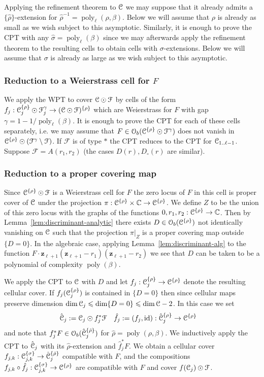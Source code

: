 \documentclass[reqno]{amsart}
\renewcommand\~[1]{\widetilde{#1}}
\def\poly{\operatorname{poly}} \def\J{\operatorname{J}}
\def\cF{{\mathcal F}} \def\cL{{\mathcal L}} \def\cR{{\mathcal R}}
\def\cO{{\mathcal O}}
\def\rest#1{{\vert_{#1}}} \def\onL{\rest{\cL}}
\def\id{\operatorname{id}}
\def\vz{{\mathbf z}}
\def\he#1{{\{#1\}}}
\def\hrho{{\he\rho}}
\def\hsigma{{\he\sigma}}
\begin{document}
Applying the refinement theorem to ${\mathcal C}$ we may suppose that it
already admits a $\he{\hat\rho}$-extension for
$\hat\rho^{-1}=\poly_\ell(\rho,\beta)$. Below we will assume that
$\rho$ is already as small as we wish subject to this
asymptotic. Similarly, it is enough to prove the CPT with any
$\hat\sigma=\poly_\ell(\beta)$ since we may afterwards apply the refinement
theorem to the resulting cells to obtain cells with
$\sigma$-extensions. Below we will assume that $\sigma$ is already as
large as we wish subject to this asymptotic.

\subsubsection{Reduction to a Weierstrass cell for $F$}

We apply the WPT to cover $\cC\odot\cF$ by cells of the form
$f_j:\cC_j^\hrho\odot\cF_j^\gamma\to(\cC\odot\cF)^\hrho$ which are Weierstrass
for $F$ with gap $\gamma=1-1/\poly_\ell(\beta)$. It is enough to prove
the CPT for each of these cells separately, i.e. we may assume that
$F\in\cO_b(\cC^\hrho\odot\cF^\gamma)$ does not vanish in
$\cC^\hrho\odot(\cF^\gamma\setminus\cF)$. If $\cF$ is of type $*$ the
CPT reduces to the CPT for ${\mathcal C}_{1..\ell-1}$. Suppose $\cF=A(r_1,r_2)$
(the cases $D(r),D_\circ(r)$ are similar).

\subsubsection{Reduction to a proper covering map}

Since $\cC^\hrho\odot\cF$ is a Weierstrass cell for $F$ the zero locus
of $F$ in this cell is proper cover of ${\mathcal C}$ under the projection
$\pi:\cC^\hrho\times\C\to\cC^\hrho$. We define $Z$ to be the union of
this zero locus with the graphs of the functions
$0,r_1,r_2:\cC^\hrho\to\C$. Then by
Lemma~\ref{lem:discriminant-analytic} there exists
$D\in\cO_b(\cC^\hrho)$ not identically vanishing on ${\mathcal C}$ such that
the projection $\pi\rest Z$ is a proper covering map outside
$\{D=0\}$. In the algebraic case, applying
Lemma~\ref{lem:discriminant-alg} to the function
$F\cdot\vz_{\ell+1}(\vz_{\ell+1}-r_1)(\vz_{\ell+1}-r_2)$ we see that
$D$ can be taken to be a polynomial of complexity $\poly(\beta)$.

We apply the CPT to ${\mathcal C}$ with $D$ and let
$f_j:\cC^\hrho_j\to\cC^\hrho$ denote the resulting cellular cover. If
$f_j(\cC_j^\hrho)$ is contained in $\{D=0\}$ then since cellular maps
preserve dimension $\dim{\mathcal C}_j\leqslant\dim\{D=0\}\leqslant\dim{\mathcal C}-2$. In this case
we set
\begin{align}
  \hat\cC_j&:=\cC_j\odot f_j^*\cF & \hat f_j&:=(f_j,\id):\hat\cC_j^\hrho\to\cC^\hrho
\end{align}
and note that $f_j^*F\in\cO_b(\hat\cC_j^{\he{\hat\rho}})$ for
$\hat\rho=\poly(\rho,\beta)$. We inductively apply the CPT to
$\hat{{\mathcal C}}_j$ with its $\hat\rho$-extension and $\hat f_j^*F$. We obtain
a cellular cover
$f_{j,k}:\cC^\hsigma_{j,k}\to\hat\cC_j^{\he{\hat\rho}}$ compatible
with $F$, and the compositions
$f_{j,k}\circ\hat f_j:\cC^\hsigma_{j,k}\to\cC^\hrho$ are compatible
with $F$ and cover $f(\cC_j)\odot\cF$.
\end{document}
